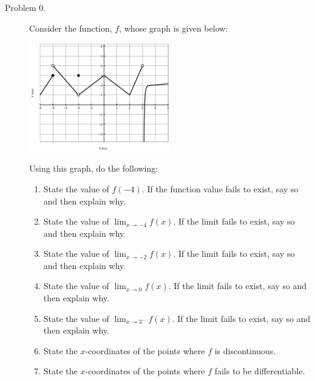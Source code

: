 \documentclass[addpoints]{exam}
\begin{document}
\begin{description}
	\item[Problem 0.] Consider the function, $f$, whose graph is given below: 
	\begin{center}
		\includegraphics[width=0.5\textwidth]{examprob0b-1}
	\end{center}
	Using this graph, do the following:
	\begin{enumerate}
		\item State the value of $f(-4)$. If the function value fails to exist, say so and then explain why. 
		\item State the value of $\displaystyle{\lim_{x \to {-4}} f(x)}$. If the limit fails to exist, say so and then explain why. 
		\item State the value of $\displaystyle{\lim_{x \to {-2}} f(x)}$. If the limit fails to exist, say so and then explain why. 
		\item State the value of $\displaystyle{\lim_{x \to 0} f(x)}$. If the limit fails to exist, say so and then explain why. 	
		\item State the value of $\displaystyle{\lim_{x \to 3^-} f(x)}$. If the limit fails to exist, say so and then explain why. 	
		\item State the $x$-coordinates of the points where $f$ is discontinuous. 
		\item State the $x$-coordinates of the points where $f$ fails to be differentiable. 
	\end{enumerate}



\hrulefill


\end{description}
\end{document}
